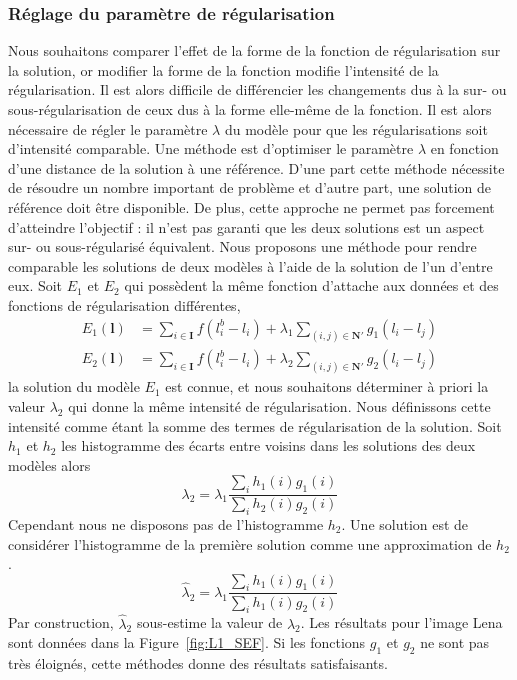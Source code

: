 \documentclass[../main/These_Mathias_Paget.tex]{subfiles}
\begin{document}
\subsubsection{Réglage du paramètre de régularisation}
\label{sss:normalize_energy}

Nous souhaitons comparer l'effet de la forme de la fonction de régularisation sur la solution, or modifier la forme de la fonction modifie l’intensité de la régularisation. Il est alors difficile de différencier les changements dus à la sur- ou sous-régularisation de ceux dus à la forme elle-même de la fonction. Il est alors nécessaire de régler le paramètre $\lambda$ du modèle pour que les régularisations soit d'intensité comparable. Une méthode est d'optimiser le paramètre $\lambda$ en fonction d'une distance de la solution à une référence. D'une part cette méthode nécessite de résoudre un nombre important de problème et d'autre part, une solution de référence doit être disponible. De plus, cette approche ne permet pas forcement d'atteindre l'objectif : il n'est pas garanti que les deux solutions est un aspect sur- ou sous-régularisé équivalent. Nous proposons une méthode pour rendre comparable les solutions de deux modèles à l'aide de la solution de l'un d'entre eux. Soit $E_1$ et $E_2$ qui possèdent la même fonction d'attache aux données et des fonctions de régularisation différentes, 
\begin{equation}
\begin{aligned}
E_1(\boldsymbol{l}) &= \sum_{i \in \boldsymbol{I}}{ f(l^b_i - l_i)} + 
\lambda_1 \sum_{(i,j) \in \boldsymbol{N'}}{ g_1(l_i-l_j) } \\
E_2(\boldsymbol{l}) &= \sum_{i \in \boldsymbol{I}}{ f(l^b_i - l_i)} + 
\lambda_2 \sum_{(i,j) \in \boldsymbol{N'}}{ g_2(l_i-l_j) }
\end{aligned}
\end{equation}
la solution du modèle $E_1$ est connue, et nous souhaitons déterminer à priori la valeur $\lambda_2$ qui donne la même intensité de régularisation. Nous définissons cette intensité comme étant la somme des termes de régularisation de la solution. Soit $h_1$ et $h_2$ les histogramme des écarts entre voisins dans les solutions des deux modèles alors
\begin{equation}
\lambda_2 = \lambda_1 \frac{\sum_i{h_1(i)g_1(i)}}{\sum_i{h_2(i)g_2(i)}}
\end{equation}
Cependant nous ne disposons pas de l'histogramme $h_2$. Une solution est de considérer l'histogramme de la première solution comme une approximation de $h_2$.
\begin{equation}
\hat{\lambda}_2 = \lambda_1 \frac{\sum_i{h_1(i)g_1(i)}}{\sum_i{h_1(i)g_2(i)}}
\end{equation}
Par construction, $\hat{\lambda}_2$ sous-estime la valeur de $\lambda_2$. Les résultats pour l'image Lena sont données dans la Figure~\ref{fig:L1_SEF}. Si les fonctions $g_1$ et $g_2$ ne sont pas très éloignés, cette méthodes donne des résultats satisfaisants.
\end{document}
